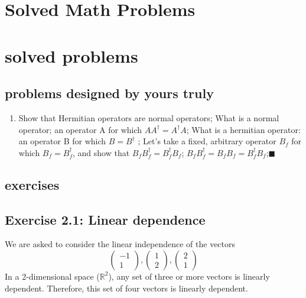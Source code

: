 \documentclass{article}
\begin{document}
\section*{Solved Math Problems}

\section{solved problems}
\subsection{problems designed by yours truly}
	\begin{enumerate}
            \item Show that Hermitian operators are normal operators; What is a normal operator; an operator A for which $AA^\dagger = A^\dagger A$; What is a hermitian operator: an operator B for which $ B = B^\dagger$ ; Let’s take a fixed, arbitrary operator $B_f$ for which $B_f = B_f^\dagger$, and show that $B_fB_f^\dagger = B_f^\dagger B_f$; $B_fB_f^\dagger = B_fB_f  = B_f^\dagger B_f$;$\blacksquare$ 
    \end{enumerate}
\subsection{exercises}
\subsection*{Exercise 2.1: Linear dependence}
We are asked to consider the linear independence of the vectors
$$ \begin{pmatrix} -1 \\ 1 \end{pmatrix}, \begin{pmatrix} 1 \\ 2 \end{pmatrix}, \begin{pmatrix} 2 \\ 1 \end{pmatrix} $$
In a 2-dimensional space ($\mathbb{R}^2$), any set of three or more vectors is linearly dependent. Therefore, this set of four vectors is linearly dependent.
\end{document}
